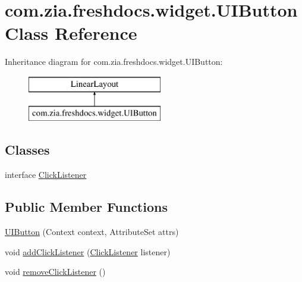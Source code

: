 \hypertarget{classcom_1_1zia_1_1freshdocs_1_1widget_1_1_u_i_button}{\section{com.\-zia.\-freshdocs.\-widget.\-U\-I\-Button Class Reference}
\label{classcom_1_1zia_1_1freshdocs_1_1widget_1_1_u_i_button}
}
Inheritance diagram for com.\-zia.\-freshdocs.\-widget.\-U\-I\-Button\-:\begin{figure}[H]
\begin{center}
\leavevmode
\includegraphics[height=2.000000cm]{classcom_1_1zia_1_1freshdocs_1_1widget_1_1_u_i_button}
\end{center}
\end{figure}
\subsection*{Classes}
\begin{DoxyCompactItemize}
\item 
interface \hyperlink{interfacecom_1_1zia_1_1freshdocs_1_1widget_1_1_u_i_button_1_1_click_listener}{Click\-Listener}
\end{DoxyCompactItemize}
\subsection*{Public Member Functions}
\begin{DoxyCompactItemize}
\item 
\hyperlink{classcom_1_1zia_1_1freshdocs_1_1widget_1_1_u_i_button_ad8b0e1fdeb4a69deb64b7cffee92af4f}{U\-I\-Button} (Context context, Attribute\-Set attrs)
\item 
void \hyperlink{classcom_1_1zia_1_1freshdocs_1_1widget_1_1_u_i_button_a2440560eb6dd3fa75fd59aaba4718f2a}{add\-Click\-Listener} (\hyperlink{interfacecom_1_1zia_1_1freshdocs_1_1widget_1_1_u_i_button_1_1_click_listener}{Click\-Listener} listener)
\item 
void \hyperlink{classcom_1_1zia_1_1freshdocs_1_1widget_1_1_u_i_button_ab2b47f453849e5ecc95341c5e58005fd}{remove\-Click\-Listener} ()
\end{DoxyCompactItemize}


